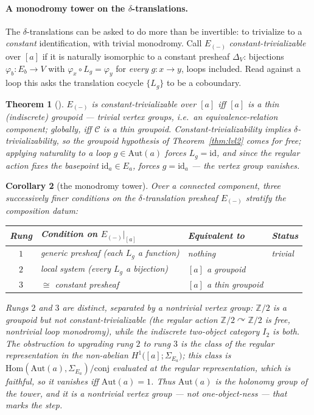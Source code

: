 \documentclass[11pt]{article}
\newtheorem{theorem}{Theorem}
\newtheorem{corollary}[theorem]{Corollary}
\theoremstyle{definition}
\newcommand{\Hom}{\mathrm{Hom}}
\newcommand{\Aut}{\mathrm{Aut}}
\newcommand{\Z}{\mathbb{Z}}
\newcommand{\id}{\mathrm{id}}
\newcommand{\cC}{\mathcal{C}}
\begin{document}
\paragraph{A monodromy tower on the $\delta$-translations.}
The $\delta$-translations can be asked to do more than be invertible: to trivialize to a
\emph{constant} identification, with trivial monodromy. Call $E_{(-)}$
\emph{constant-trivializable} over $[a]$ if it is naturally isomorphic to a constant presheaf
$\Delta_V$: bijections $\varphi_b\colon E_b\to V$ with $\varphi_x\circ L_g=\varphi_y$ for \emph{every}
$g\colon x\to y$, loops included. Read against a loop this asks the translation cocycle $\{L_g\}$ to
be a coboundary.

\begin{theorem}[\cite{MacBethThin}]\label{thm:thin}
$E_{(-)}$ is constant-trivializable over $[a]$ iff $[a]$ is a \emph{thin} (indiscrete) groupoid ---
trivial vertex groups, i.e.\ an equivalence-relation component; globally, iff $\cC$ is a thin
groupoid. Constant-trivializability implies $\delta$-trivializability, so the groupoid hypothesis of
Theorem~\ref{thm:lvl2} comes for free; applying naturality to a loop $g\in\Aut(a)$ forces $L_g=\id$,
and since the regular action fixes the basepoint $\id_a\in E_a$, forces $g=\id_a$ --- the vertex group
vanishes.
\end{theorem}

\begin{corollary}[the monodromy tower]\label{cor:tower}
Over a connected component, three successively finer conditions on the $\delta$-translation presheaf
$E_{(-)}$ stratify the composition datum:
\begin{center}
\begin{tabular}{@{}clll@{}}
\toprule
Rung & Condition on $E_{(-)}\big|_{[a]}$ & Equivalent to & Status \\
\midrule
$1$ & generic presheaf (each $L_g$ a function) & nothing & trivial \\
$2$ & local system (every $L_g$ a bijection) & $[a]$ a groupoid & \cite{MacBethDelta} \\
$3$ & $\cong$ constant presheaf & $[a]$ a thin groupoid & \cite{MacBethThin} \\
\bottomrule
\end{tabular}
\end{center}
Rungs $2$ and $3$ are distinct, separated by a nontrivial vertex group: $\Z/2$ is a groupoid but not
constant-trivializable (the regular action $\Z/2\curvearrowright\Z/2$ is free, nontrivial loop
monodromy), while the indiscrete two-object category $I_2$ is both. The obstruction to upgrading rung
$2$ to rung $3$ is the \emph{class of the regular representation} in the non-abelian
$H^1\!\big([a];\Sigma_{E_a}\big)$; this class is $\Hom(\Aut(a),\Sigma_{E_a})/\text{conj}$ evaluated at
the regular representation, which is faithful, so it vanishes iff $\Aut(a)=1$. Thus $\Aut(a)$ is the
\emph{holonomy group} of the tower, and it is a nontrivial \emph{vertex group} --- not
one-object-ness --- that marks the step.
\end{corollary}
\end{document}
